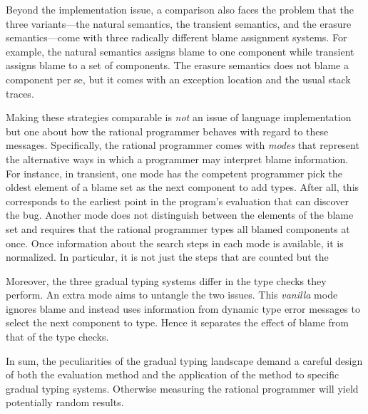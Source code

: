Beyond the implementation issue, a comparison also faces the problem that the
three variants---the natural semantics, the transient semantics, and the erasure
semantics---come with three radically different blame assignment systems.  For
example, the natural semantics assigns blame to one component while transient
assigns blame to a set of components. The erasure semantics does not blame a
component per se, but it comes with an exception location and the usual stack
traces. 

Making these strategies comparable is {\em not\/} an issue of language
implementation but one about how the rational programmer behaves with regard to
these messages. Specifically, the rational programmer comes with \emph{modes}
that represent the alternative ways in which a programmer may interpret blame
information. For instance, in transient, one mode has the competent programmer
pick the oldest element of a blame set as the next component to add types. After
all, this corresponds to the earliest point in the program's evaluation that can
discover the bug.  Another mode does not distinguish between the elements of the
blame set and requires that the rational programmer types all blamed components
at once.  Once information about the search steps in each mode is available, it
is normalized. In particular, it is not just the steps that are counted but the

Moreover, the three gradual typing systems differ in the type checks they
perform.  An extra mode aims to untangle the two issues. This \emph{vanilla} mode
ignores blame and instead uses information from dynamic type error messages to
select the next component to type. Hence it separates the effect of blame from
that of the type checks. 

In sum, the peculiarities of the gradual typing landscape demand a careful
design of both the evaluation method and the application of the method to
specific gradual typing systems. Otherwise measuring the rational programmer
will yield potentially random results. 
